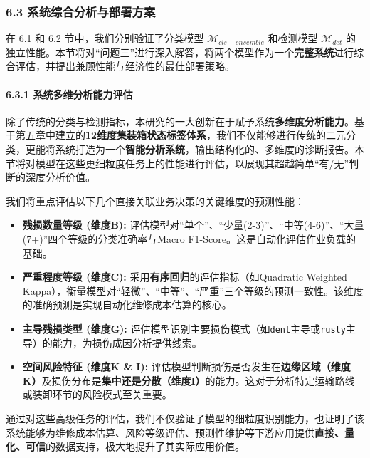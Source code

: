 \documentclass[
]{article}
\begin{document}
\subsubsection{\texorpdfstring{\textbf{6.3
系统综合分析与部署方案}}{6.3 系统综合分析与部署方案}}\label{63-ux7cfbux7edfux7efcux5408ux5206ux6790ux4e0eux90e8ux7f72ux65b9ux6848}

在 6.1 和 6.2 节中，我们分别验证了分类模型
\(\mathcal{M}_{cls-ensemble}\) 和检测模型 \(\mathcal{M}_{det}\)
的独立性能。本节将对``问题三''进行深入解答，将两个模型作为一个\textbf{完整系统}进行综合评估，并提出兼顾性能与经济性的最佳部署策略。

\paragraph{\texorpdfstring{\textbf{6.3.1
系统多维分析能力评估}}{6.3.1 系统多维分析能力评估}}\label{631-ux7cfbux7edfux591aux7ef4ux5206ux6790ux80fdux529bux8bc4ux4f30}

除了传统的分类与检测指标，本研究的一大创新在于赋予系统\textbf{多维度分析能力}。基于第五章中建立的\textbf{12维度集装箱状态标签体系}，我们不仅能够进行传统的二元分类，更能将系统打造为一个\textbf{智能分析系统}，输出结构化的、多维度的诊断报告。本节将对模型在这些更细粒度任务上的性能进行评估，以展现其超越简单``有/无''判断的深度分析价值。

我们将重点评估以下几个直接关联业务决策的关键维度的预测性能：

\begin{itemize}
\item
  \textbf{残损数量等级 (维度B):}
  评估模型对``单个''、``少量(2-3)''、``中等(4-6)''、``大量(7+)''四个等级的分类准确率与Macro
  F1-Score。这是自动化评估作业负载的基础。
\item
  \textbf{严重程度等级 (维度C):}
  采用\textbf{有序回归}的评估指标（如Quadratic Weighted
  Kappa），衡量模型对``轻微''、``中等''、``严重''三个等级的预测一致性。该维度的准确预测是实现自动化维修成本估算的核心。
\item
  \textbf{主导残损类型 (维度G):}
  评估模型识别主要损伤模式（如\texttt{dent}主导或\texttt{rusty}主导）的能力，为损伤成因分析提供线索。
\item
  \textbf{空间风险特征 (维度K \& I):}
  评估模型判断损伤是否发生在\textbf{边缘区域（维度K）}及损伤分布是\textbf{集中还是分散（维度I）}的能力。这对于分析特定运输路线或装卸环节的风险模式至关重要。
\end{itemize}

通过对这些高级任务的评估，我们不仅验证了模型的细粒度识别能力，也证明了该系统能够为维修成本估算、风险等级评估、预测性维护等下游应用提供\textbf{直接、量化、可信}的数据支持，极大地提升了其实际应用价值。
\end{document}
